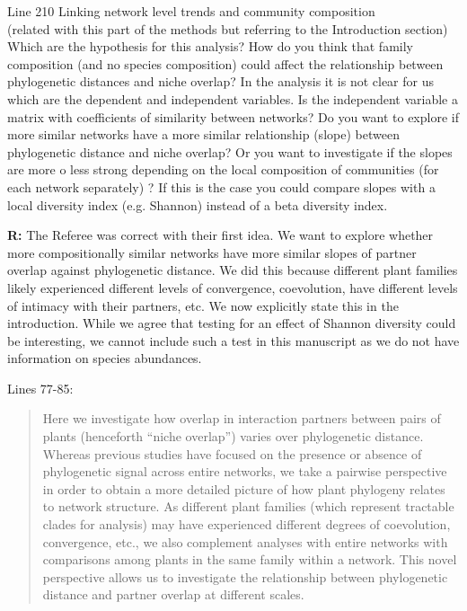 \documentclass[12pt]{letter}
\newenvironment{refquote}{\bigskip \begin{it}}{\end{it}\smallskip}
\begin{document}
		\begin{refquote}
			Line 210 Linking network level trends and community composition\\

			(related with this part of the methods but referring to the Introduction section) Which are the hypothesis for this analysis? How do you think that family composition (and no species composition) could affect the relationship between phylogenetic  distances and niche overlap?
			In the analysis it is not clear for us which are the dependent and independent variables. Is the independent variable a matrix with coefficients of similarity between networks?  Do you want to explore if more similar networks have a more similar relationship (slope) between phylogenetic distance and niche overlap? Or you want to investigate if the slopes are more o less strong depending on the local composition of communities (for each network separately) ? If this is the case you could compare slopes with a local diversity index (e.g. Shannon) instead of a beta diversity index.
		\end{refquote}


		\textbf{R:} The Referee was correct with their first idea. We want to explore whether more compositionally similar networks have more similar slopes of partner overlap against phylogenetic distance. We did this because different plant families likely experienced different levels of convergence, coevolution, have different levels of intimacy with their partners, etc. We now explicitly state this in the introduction. While we agree that testing for an effect of Shannon diversity could be interesting, we cannot include such a test in this manuscript as we do not have information on species abundances.


		Lines 77-85:

		\begin{quotation}

			Here we investigate how overlap in interaction partners between 
			pairs of plants (henceforth ``niche overlap'') varies over 
			phylogenetic distance. 
			Whereas previous 
			studies have focused on the presence or absence of phylogenetic
			signal across entire networks, we take a pairwise perspective in
			order to obtain a more detailed picture of how plant phylogeny
			relates to network structure. As different plant families (which represent tractable clades for analysis) may have experienced different degrees of coevolution, convergence, etc., we also complement analyses with entire networks with comparisons among plants in the same family within a network. 
			This novel perspective allows us to investigate the relationship between phylogenetic distance and partner overlap at different scales. 

  		\end{quotation}
\end{document}
